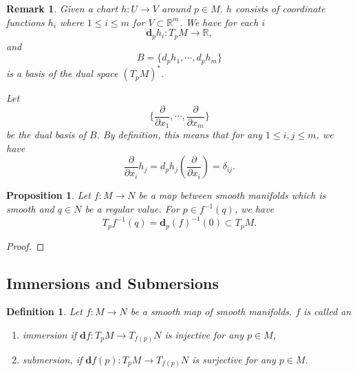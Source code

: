 \documentclass{article}
\newtheorem{proposition}{Proposition}[section]
\newtheorem{definition}{Definition}[section]
\newtheorem{remark}{Remark}[section]
\numberwithin{equation}{section}
\begin{document}
\begin{remark}
Given a chart $h:U\to V$ around $p\in M$. $h$ consists of coordinate functions $h_i$ where $1\leq i\leq m$ for $V\subset\mathbb{R}^m$. We have for each $i$
\begin{equation*}
\mathbf{d}_ph_i:T_pM\to\mathbb{R},
\end{equation*}
and 
\begin{equation*}
B=\{d_ph_1,\cdots,d_ph_m\}
\end{equation*}
is a basis of the dual space $(T_pM)^*$.\\
\par Let 
\begin{equation*}
\{{\frac {\partial} {\partial x_1}},\cdots,{\frac {\partial} {\partial x_m}}\}
\end{equation*}
be the dual basis of $B$. By definition, this means that for any $1\leq i,j\leq m$, we have
\begin{equation*}
{\frac {\partial} {\partial x_i}}h_j = d_ph_j({\frac {\partial} {\partial x_i}}) = \delta_{ij}.
\end{equation*}
\end{remark}

\begin{proposition}
Let $f:M\to N$ be a map between smooth manifolds which is smooth and $q\in N$ be a regular value. For $p\in f^{-1}(q)$, we have
\begin{equation*}
T_pf^{-1}(q) = \mathbf{d}_p(f)^{-1}(0)\subset T_pM.
\end{equation*}
\end{proposition}

\begin{proof}

\end{proof}

\subsection{Immersions and Submersions}

\begin{definition}
Let $f:M\to N$ be a smooth map of smooth manifolds. $f$ is called an
\begin{enumerate}[1).]
\item immersion if $\mathbf{d}f:T_pM\to T_{f(p)}N$ is injective for any $p\in M$,
\item submersion, if $\mathbf{d}f(p):T_pM\to T_{f(p)}N$ is surjective for any $p\in M$.
\end{enumerate}
\end{definition}
\end{document}
